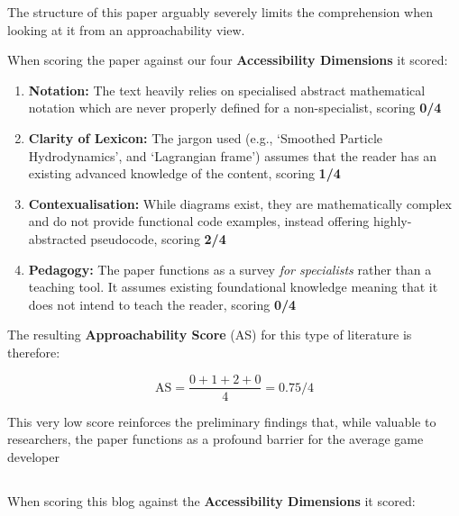 The structure of this paper arguably severely limits the comprehension when looking at it from an approachability view.

When scoring the paper against our four \textbf{Accessibility Dimensions} it scored:

\begin{enumerate}
    \item \textbf{Notation:} The text heavily relies on specialised abstract mathematical notation which are never properly defined for a non-specialist, scoring \textbf{0/4}
    \item \textbf{Clarity of Lexicon:} The jargon used (e.g., `Smoothed Particle Hydrodynamics', and `Lagrangian frame') assumes that the reader has an existing advanced knowledge of the content, scoring \textbf{1/4}
    \item \textbf{Contexualisation:} While diagrams exist, they are mathematically complex and do not provide functional code examples, instead offering highly-abstracted pseudocode, scoring \textbf{2/4}
    \item \textbf{Pedagogy:} The paper functions as a survey \textit{for specialists} rather than a teaching tool. It assumes existing foundational knowledge meaning that it does not intend to teach the reader, scoring \textbf{0/4}
\end{enumerate}

The resulting \textbf{Approachability Score} (AS) for this type of literature is therefore:

\begin{equation}
    \text{AS} = \frac{0 + 1 + 2 + 0}{4} = 0.75 / 4
\end{equation}

This very low score reinforces the preliminary findings that, while valuable to researchers, the paper functions as a profound barrier for the average game developer

\subsection{}

When scoring this blog against the \textbf{Accessibility Dimensions} it scored:

